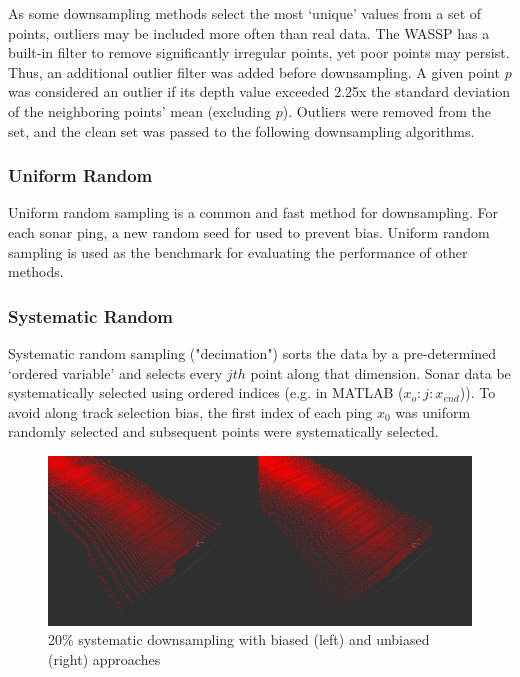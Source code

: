 As some downsampling methods select the most `unique' values from a set of points, outliers may be included more often than real data. The WASSP has a built-in filter to remove significantly irregular points, yet poor points may persist. Thus, an additional outlier filter was added before downsampling. A given point $p$ was considered an outlier if its depth value exceeded 2.25x the standard deviation of the neighboring points' mean (excluding $p$). Outliers were removed from the set, and the clean set was passed to the following downsampling algorithms.   

\subsubsection{Uniform Random}

Uniform random sampling is a common and fast method for downsampling. For each sonar ping, a new random seed for used to prevent bias. Uniform random sampling is used as the benchmark for evaluating the performance of other methods.

\subsubsection{Systematic Random}

Systematic random sampling ("decimation") sorts the data by a pre-determined `ordered variable' and selects every $jth$ point along that dimension. Sonar data be systematically selected using ordered indices (e.g. in MATLAB ($x_o:j:x_{end}$)). To avoid along track selection bias, the first index of each ping $x_0$ was uniform randomly selected and subsequent points were systematically selected.

\begin{figure}[!ht]
    \begin{center}
       \includegraphics[width=.75\textwidth]{images/systematic_sidebyside_random_vs_norandom.png}
    \end{center}
    \caption{20\% systematic downsampling with biased (left) and unbiased (right) approaches}
    \label{fig:systematic_random_sampling_bias}
\end{figure}

